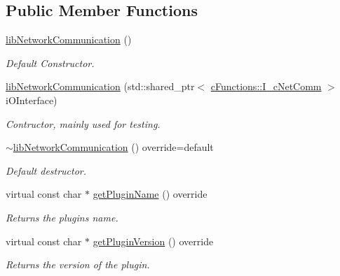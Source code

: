 \subsection*{Public Member Functions}
\begin{DoxyCompactItemize}
\item 
\mbox{\hyperlink{classlibNetworkCommunication_1_1libNetworkCommunication_a6f0822fd868efd3ec1f165e3846fec13}{lib\+Network\+Communication}} ()
\begin{DoxyCompactList}\small\item\em Default Constructor. \end{DoxyCompactList}\item 
\mbox{\hyperlink{classlibNetworkCommunication_1_1libNetworkCommunication_aa76eab73e3cd744e3b498aba32fbc071}{lib\+Network\+Communication}} (std\+::shared\+\_\+ptr$<$ \mbox{\hyperlink{classcFunctions_1_1I__cNetComm}{c\+Functions\+::\+I\+\_\+c\+Net\+Comm}} $>$ i\+O\+Interface)
\begin{DoxyCompactList}\small\item\em Contructor, mainly used for testing. \end{DoxyCompactList}\item 
\mbox{\label{classlibNetworkCommunication_1_1libNetworkCommunication_a4bd388e015da252c0aabf247d764372a}} 
\mbox{\hyperlink{classlibNetworkCommunication_1_1libNetworkCommunication_a4bd388e015da252c0aabf247d764372a}{$\sim$lib\+Network\+Communication}} () override=default
\begin{DoxyCompactList}\small\item\em Default destructor. \end{DoxyCompactList}\item 
virtual const char $\ast$ \mbox{\hyperlink{classlibNetworkCommunication_1_1libNetworkCommunication_a2d09c69b582a66b37100ce87ee1acdd1}{get\+Plugin\+Name}} () override
\begin{DoxyCompactList}\small\item\em Returns the plugins name. \end{DoxyCompactList}\item 
virtual const char $\ast$ \mbox{\hyperlink{classlibNetworkCommunication_1_1libNetworkCommunication_a78dce6f61316f1f2068c0f03c7cc4b32}{get\+Plugin\+Version}} () override
\begin{DoxyCompactList}\small\item\em Returns the version of the plugin. \end{DoxyCompactList}\item 

\end{DoxyCompactItemize}
